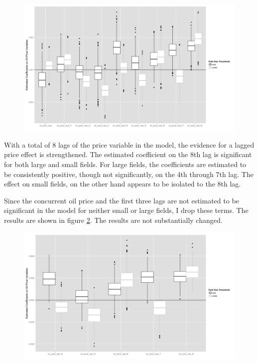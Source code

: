\documentclass[12pt]{article}
\begin{document}
\begin{figure}
	\includegraphics[width=1\textwidth]{figures/gam_price_8_print.png}
	\caption{}
	\label{gam_price_8}
\end{figure}

With a total of 8 lags of the price variable in the model, the evidence for a lagged price effect is strengthened.  The estimated coefficient on the 8th lag is significant for both large and small fields.  For large fields, the coefficients are estimated to be consistently positive, though not significantly, on the 4th through 7th lag.  The effect on small fields, on the other hand appears to be isolated to the 8th lag. 

Since the concurrent oil price and the first three lags are not estimated to be significant in the model for neither small or large fields, I drop these terms.  The results are shown in figure \ref{gam_price_short}.  The results are not substantially changed.  

\begin{figure}
	\includegraphics[width=1\textwidth]{figures/gam_price_short_print.png}
	\caption{}
	\label{gam_price_short}
\end{figure}
\end{document}
